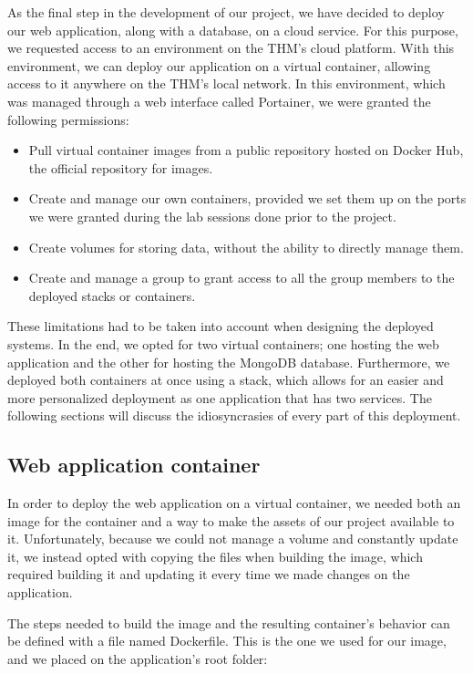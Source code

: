 As the final step in the development of our project, we have decided to deploy our web application, along with a database, on a cloud service. For this purpose, we requested access to an environment on the THM's cloud platform. With this environment, we can deploy our application on a virtual container, allowing access to it anywhere on the THM's local network. In this environment, which was managed through a web interface called Portainer, we were granted the following permissions:
\begin{itemize}
    \item Pull virtual container images from a public repository hosted on Docker Hub, the official repository for images.
    \item Create and manage our own containers, provided we set them up on the ports we were granted during the lab sessions done prior to the project.
    \item Create volumes for storing data, without the ability to directly manage them.
    \item  Create and manage a group to grant access to all the group members to the deployed stacks or containers.
\end{itemize}

These limitations had to be taken into account when designing the deployed systems. In the end, we opted for two virtual containers; one hosting the web application and the other for hosting the MongoDB database. Furthermore, we deployed both containers at once using a stack, which allows for an easier and more personalized deployment as one application that has two services. The following sections will discuss the idiosyncrasies of every part of this deployment.

\subsection{Web application container}

In order to deploy the web application on a virtual container, we needed both an image for the container and a way to make the assets of our project available to it. Unfortunately, because we could not manage a volume and constantly update it, we instead opted with copying the files when building the image, which required building it and updating it every time we made changes on the application.

The steps needed to build the image and the resulting container's behavior can be defined with a file named Dockerfile. This is the one we used for our image, and we placed on the application's root folder:

